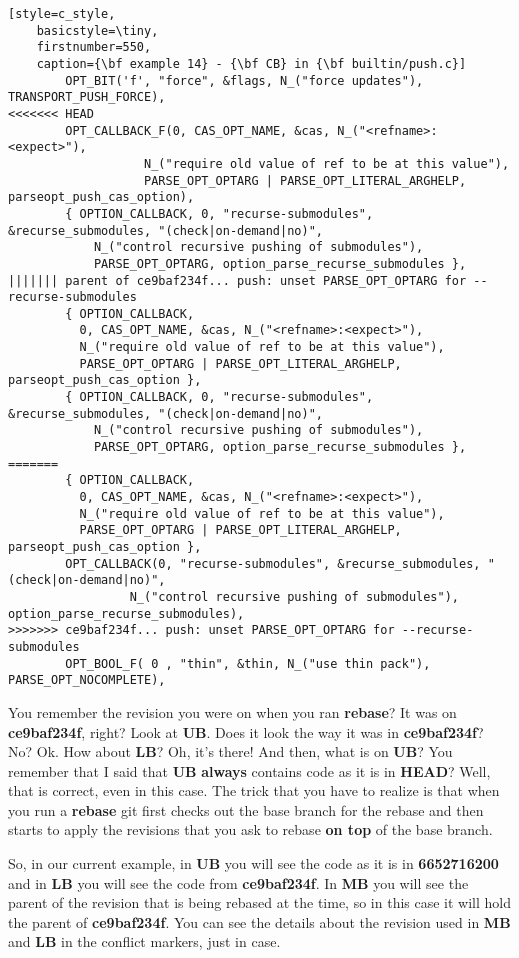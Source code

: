 \begin{lstlisting}[style=c_style,
	basicstyle=\tiny,
	firstnumber=550,
	caption={\bf example 14} - {\bf CB} in {\bf builtin/push.c}]
		OPT_BIT('f', "force", &flags, N_("force updates"), TRANSPORT_PUSH_FORCE),
<<<<<<< HEAD
		OPT_CALLBACK_F(0, CAS_OPT_NAME, &cas, N_("<refname>:<expect>"),
			       N_("require old value of ref to be at this value"),
			       PARSE_OPT_OPTARG | PARSE_OPT_LITERAL_ARGHELP, parseopt_push_cas_option),
		{ OPTION_CALLBACK, 0, "recurse-submodules", &recurse_submodules, "(check|on-demand|no)",
			N_("control recursive pushing of submodules"),
			PARSE_OPT_OPTARG, option_parse_recurse_submodules },
||||||| parent of ce9baf234f... push: unset PARSE_OPT_OPTARG for --recurse-submodules
		{ OPTION_CALLBACK,
		  0, CAS_OPT_NAME, &cas, N_("<refname>:<expect>"),
		  N_("require old value of ref to be at this value"),
		  PARSE_OPT_OPTARG | PARSE_OPT_LITERAL_ARGHELP, parseopt_push_cas_option },
		{ OPTION_CALLBACK, 0, "recurse-submodules", &recurse_submodules, "(check|on-demand|no)",
			N_("control recursive pushing of submodules"),
			PARSE_OPT_OPTARG, option_parse_recurse_submodules },
=======
		{ OPTION_CALLBACK,
		  0, CAS_OPT_NAME, &cas, N_("<refname>:<expect>"),
		  N_("require old value of ref to be at this value"),
		  PARSE_OPT_OPTARG | PARSE_OPT_LITERAL_ARGHELP, parseopt_push_cas_option },
		OPT_CALLBACK(0, "recurse-submodules", &recurse_submodules, "(check|on-demand|no)",
			     N_("control recursive pushing of submodules"), option_parse_recurse_submodules),
>>>>>>> ce9baf234f... push: unset PARSE_OPT_OPTARG for --recurse-submodules
		OPT_BOOL_F( 0 , "thin", &thin, N_("use thin pack"), PARSE_OPT_NOCOMPLETE),
\end{lstlisting}

You remember the revision you were on when you ran {\bf rebase}? It was on {\bf ce9baf234f}, right? Look at {\bf UB}. Does
it look the way it was in {\bf ce9baf234f}? No? Ok. How about {\bf LB}? Oh, it's there! And then, what is on {\bf UB}? You
remember that I said that {\bf UB} {\bf always} contains code as it is in {\bf HEAD}? Well, that is correct, even in this case.
The trick that you have to realize is that when you run a {\bf rebase} git first checks out the base branch for the rebase and
then starts to apply the revisions that you ask to rebase {\bf on top} of the base branch.

So, in our current example, in {\bf UB} you will see the code as it is in {\bf 6652716200} and in {\bf LB} you will see the
code from {\bf ce9baf234f}. In {\bf MB} you will see the parent of the revision that is being rebased at the time, so in this
case it will hold the parent of {\bf ce9baf234f}. You can see the details about the revision used in {\bf MB} and {\bf LB}
in the conflict markers, just in case.

